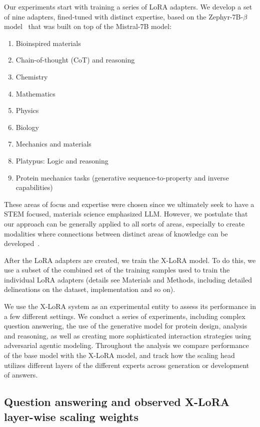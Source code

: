 Our experiments start with training a series of LoRA adapters. We develop a set of nine adapters, fined-tuned with distinct expertise, based on the Zephyr-7B-$\beta$ model~\cite{HuggingFaceH4/zephyr-7b-betaFace} that was built on top of the Mistral-7B model\cite{Jiang2023Mistral7B}:
\begin{enumerate}
    \item Bioinspired materials 
    \item Chain-of-thought (CoT) and reasoning 
    \item Chemistry
    \item Mathematics
    \item Physics
    \item Biology
    \item Mechanics and materials
    \item Platypus: Logic and reasoning 
    \item Protein mechanics tasks (generative sequence-to-property and inverse capabilities)
\end{enumerate}
These areas of focus and expertise were chosen since we ultimately seek to have a STEM focused, materials science emphasized LLM. However, we postulate that our approach can be generally applied to all sorts of areas, especially to create modalities where connections between distinct areas of knowledge can be developed~\cite{Buehler2023MechGPTModalities,Buehler2023MeLMProblemsb}. 

After the LoRA adapters are created, we train the X-LoRA model. To do this, we use a subset of the combined set of the training samples used to train the individual LoRA adapters (details see Materials and Methods, including detailed delineations on the dataset, implementation and so on). 


We use the X-LoRA system as an experimental entity to assess its performance in a few different settings. We conduct a series of experiments, including complex question answering, the use of the generative model for protein design, analysis and reasoning, as well as creating more sophisticated interaction strategies using adversarial agentic modeling. Throughout the analysis we compare performance of the base model with the X-LoRA model, and track how the scaling head utilizes different layers of the different experts across generation or development of answers. 

\subsection{Question answering and observed X-LoRA layer-wise scaling weights}

